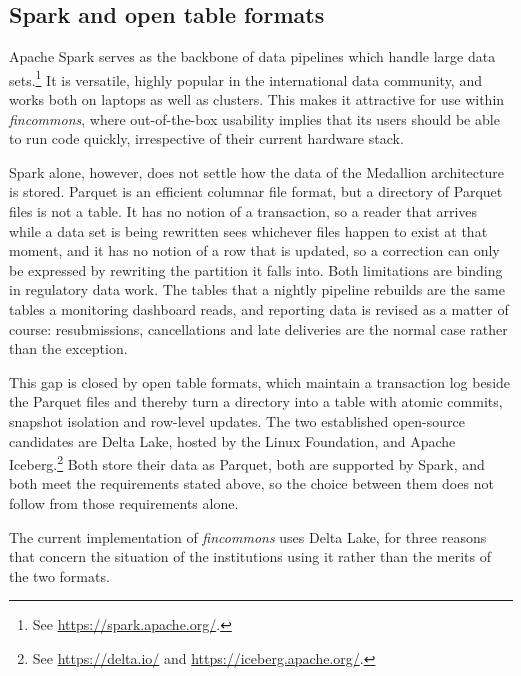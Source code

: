 \documentclass[a4paper, 11pt]{report}
\begin{document}
\subsection{Spark and open table formats\label{sec:intro-data-formats}}

Apache Spark serves as the backbone of data pipelines which handle large data sets.\footnote{See \url{https://spark.apache.org/}.} It is versatile, highly popular in the international data community, and works both on laptops as well as clusters. This makes it attractive for use within \emph{fincommons}, where out-of-the-box usability implies that its users should be able to run code quickly, irrespective of their current hardware stack.

Spark alone, however, does not settle how the data of the Medallion architecture is stored. Parquet is an efficient columnar file format, but a directory of Parquet files is not a table. It has no notion of a transaction, so a reader that arrives while a data set is being rewritten sees whichever files happen to exist at that moment, and it has no notion of a row that is updated, so a correction can only be expressed by rewriting the partition it falls into. Both limitations are binding in regulatory data work. The tables that a nightly pipeline rebuilds are the same tables a monitoring dashboard reads, and reporting data is revised as a matter of course: resubmissions, cancellations and late deliveries are the normal case rather than the exception.

This gap is closed by open table formats, which maintain a transaction log beside the Parquet files and thereby turn a directory into a table with atomic commits, snapshot isolation and row-level updates. The two established open-source candidates are Delta Lake, hosted by the Linux Foundation, and Apache Iceberg.\footnote{See \url{https://delta.io/} and \url{https://iceberg.apache.org/}.} Both store their data as Parquet, both are supported by Spark, and both meet the requirements stated above, so the choice between them does not follow from those requirements alone.

The current implementation of \emph{fincommons} uses Delta Lake, for three reasons that concern the situation of the institutions using it rather than the merits of the two formats.
\end{document}
